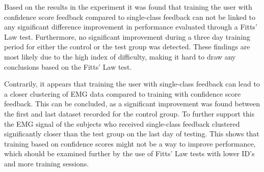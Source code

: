 Based on the results in the experiment it was found that training the user with confidence score feedback compared to single-class feedback can not be linked to any significant difference improvement in performance evaluated through a Fitts' Law test. Furthermore, no significant improvement during a three day training period for either the control or the test group was detected. These findings are most likely due to the high index of difficulty, making it hard to draw any conclusions based on the Fitts' Law test. 

Contrarily, it appears that training the user with single-class feedback can lead to a closer clustering of EMG data compared to training with confidence score feedback. This can be concluded, as a significant improvement was found between the first and last dataset recorded for the control group. To further support this the EMG signal of the subjects who received single-class feedback clustered significantly closer than the test group on the last day of testing. This shows that training based on confidence scores might not be a way to improve performance, which should be examined further by the use of Fitts' Law tests with lower ID's and more training sessions. 